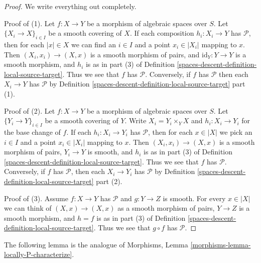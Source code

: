 \begin{proof}
We write everything out completely.

\medskip\noindent
Proof of (1). Let $f : X \to Y$ be a morphism of algebraic spaces over $S$.
Let $\{X_i \to X\}_{i \in I}$ be a smooth covering of $X$. If each composition
$h_i : X_i \to Y$ has $\mathcal{P}$, then for each $|x| \in X$ we can find
an $i \in I$ and a point $x_i \in |X_i|$ mapping to $x$. Then
$(X_i, x_i) \to (X, x)$ is a smooth morphism of pairs, and
$\text{id}_Y : Y \to Y$ is a smooth morphism, and $h_i$ is as in part (3) of
Definition \ref{spaces-descent-definition-local-source-target}.
Thus we see that $f$ has $\mathcal{P}$.
Conversely, if $f$ has $\mathcal{P}$ then each $X_i \to Y$ has
$\mathcal{P}$ by
Definition \ref{spaces-descent-definition-local-source-target} part (1).

\medskip\noindent
Proof of (2). Let $f : X \to Y$ be a morphism of algebraic spaces over $S$.
Let $\{Y_i \to Y\}_{i \in I}$ be a smooth covering of $Y$.
Write $X_i = Y_i \times_Y X$ and $h_i : X_i \to Y_i$ for the base change
of $f$.  If each  $h_i : X_i \to Y_i$ has $\mathcal{P}$, then for each
$x \in |X|$ we pick an $i \in I$ and a point $x_i \in |X_i|$ mapping to $x$.
Then $(X_i, x_i) \to (X, x)$ is a smooth morphism of pairs, $Y_i \to Y$ is
smooth, and $h_i$ is as in part (3) of
Definition \ref{spaces-descent-definition-local-source-target}.
Thus we see that $f$ has $\mathcal{P}$.
Conversely, if $f$ has $\mathcal{P}$, then each $X_i \to Y_i$ has
$\mathcal{P}$ by
Definition \ref{spaces-descent-definition-local-source-target} part (2).

\medskip\noindent
Proof of (3). Assume $f : X \to Y$ has $\mathcal{P}$ and $g : Y \to Z$ is
smooth. For every $x \in |X|$ we can think of $(X, x) \to (X, x)$ as a
smooth morphism of pairs, $Y \to Z$ is a smooth morphism, and $h = f$ is as
in part (3) of
Definition \ref{spaces-descent-definition-local-source-target}.
Thus we see that $g \circ f$ has $\mathcal{P}$.
\end{proof}

The following lemma is the analogue of
Morphisms, Lemma \ref{morphisms-lemma-locally-P-characterize}.

